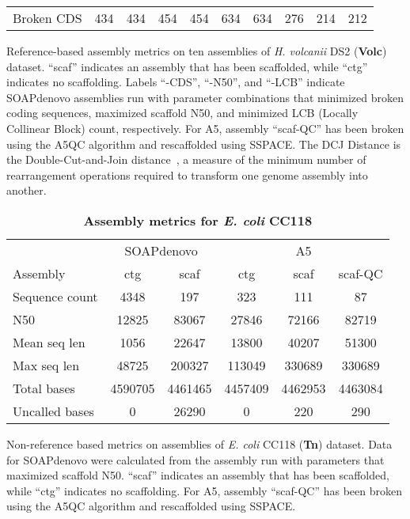 \documentclass[10pt]{article}
\begin{document}
\begin{table}[hp]
\begin{tabular}{l|cccccc|ccc}
Broken CDS         & 434     & 434      & 454     & 454      & 634     & 634      & 276    & 214      & 212     \\
\end{tabular}
\begin{flushleft} Reference-based assembly metrics on ten assemblies of \textit{H. volcanii} DS2 
(\textbf{Volc}) dataset. ``scaf'' indicates an assembly that has been scaffolded, while ``ctg'' indicates no scaffolding. 
Labels ``-CDS'', ``-N50'', and ``-LCB'' indicate SOAPdenovo assemblies run with parameter combinations that minimized broken coding 
sequences, maximized scaffold N50, and minimized LCB (Locally Collinear Block) count, respectively. For A5, assembly ``scaf-QC'' has been 
broken using the A5QC algorithm and rescaffolded using SSPACE. The DCJ Distance is the Double-Cut-and-Join distance~\cite{Bergeron2006},
a measure of the minimum number of rearrangement operations required to transform one genome assembly into another.
\end{flushleft}
\label{tab:tab01}
\end{table}


\begin{table}[hp]
\caption{  
\bf{Assembly metrics for \emph{E. coli} CC118}}
{\begin{tabular}{l|cc|ccc}
& \multicolumn{2}{c|}{SOAPdenovo} & \multicolumn{3}{c}{A5} \\
Assembly        & ctg     & scaf    & ctg     & scaf    & scaf-QC \\
Sequence count  & 4348    & 197     & 323     & 111     & 87      \\
N50             & 12825   & 83067   & 27846   & 72166   & 82719   \\
Mean seq len    & 1056    & 22647   & 13800   & 40207   & 51300   \\
Max seq len     & 48725   & 200327  & 113049  & 330689  & 330689  \\
Total bases     & 4590705 & 4461465 & 4457409 & 4462953 & 4463084 \\
Uncalled bases  & 0       & 26290   & 0       & 220     & 290     \\
\end{tabular}}
\begin{flushleft} Non-reference based metrics on assemblies of \emph{E. coli} CC118 (\textbf{Tn}) dataset. Data
for SOAPdenovo were calculated from the assembly run with parameters that maximized scaffold N50. 
``scaf'' indicates an assembly that has been scaffolded, while ``ctg'' indicates no scaffolding. For A5, assembly ``scaf-QC'' has been 
broken using the A5QC algorithm and rescaffolded using SSPACE.
\end{flushleft}
\label{tab:tab02}
\end{table}


\clearpage
\end{document}
